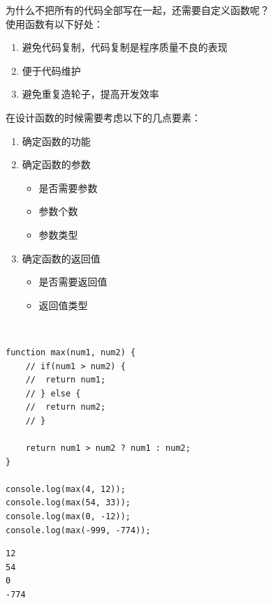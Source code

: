 为什么不把所有的代码全部写在一起，还需要自定义函数呢？ \\

使用函数有以下好处：

\begin{enumerate}
	\item 避免代码复制，代码复制是程序质量不良的表现
	\item 便于代码维护
	\item 避免重复造轮子，提高开发效率
\end{enumerate}

在设计函数的时候需要考虑以下的几点要素：

\begin{enumerate}
	\item 确定函数的功能

	\item 确定函数的参数
	      \begin{itemize}
		      \item 是否需要参数
		      \item 参数个数
		      \item 参数类型
	      \end{itemize}

	\item 确定函数的返回值
	      \begin{itemize}
		      \item 是否需要返回值
		      \item 返回值类型
	      \end{itemize}
\end{enumerate}

 \\

\begin{lstlisting}[style=htmlcssjs]
function max(num1, num2) {
    // if(num1 > num2) {
    //  return num1;
    // } else {
    //  return num2;
    // }

    return num1 > num2 ? num1 : num2;
}

console.log(max(4, 12));
console.log(max(54, 33));
console.log(max(0, -12));
console.log(max(-999, -774));
\end{lstlisting}

\begin{tcolorbox}
	\begin{verbatim}
12
54
0
-774
	\end{verbatim}
\end{tcolorbox}

\vspace{0.5cm}

